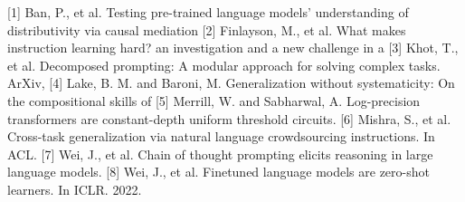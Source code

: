 [1] Ban, P., et al. Testing pre-trained language models’ understanding of distributivity via causal mediation
[2] Finlayson, M., et al. What makes instruction learning hard? an investigation and a new challenge in a
[3] Khot, T., et al. Decomposed prompting: A modular approach for solving complex tasks. ArXiv,
[4] Lake, B. M. and Baroni, M. Generalization without systematicity: On the compositional skills of
[5] Merrill, W. and Sabharwal, A. Log-precision transformers are constant-depth uniform threshold circuits.
[6] Mishra, S., et al. Cross-task generalization via natural language crowdsourcing instructions. In ACL.
[7] Wei, J., et al. Chain of thought prompting elicits reasoning in large language models.
[8] Wei, J., et al. Finetuned language models are zero-shot learners. In ICLR. 2022.
